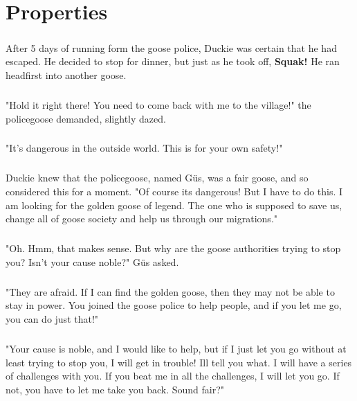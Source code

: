 \chapter{Properties}
\paragraph{} After 5 days of running form the goose police, Duckie was certain that he had escaped. He decided to stop for dinner, but just as he took off, \textbf{Squak!} He ran headfirst into another goose. 
\paragraph{} "Hold it right there! You need to come back with me to the village!" the policegoose demanded, slightly dazed. 
\paragraph{} "It's dangerous in the outside world. This is for your own safety!"
\paragraph{} Duckie knew that the policegoose, named Güs, was a fair goose, and so considered this for a moment. "Of course its dangerous! But I have to do this. I am looking for the golden goose of legend. The one who is supposed to save us, change all of goose society and help us through our migrations."
\paragraph{} "Oh. Hmm, that makes sense. But why are the goose authorities trying to stop you? Isn't your cause noble?" Güs asked.
\paragraph{} "They are afraid. If I can find the golden goose, then they may not be able to stay in power. You joined the goose police to help people, and if you let me go, you can do just that!"
\paragraph{} "Your cause is noble, and I would like to help, but if I just let you go without at least trying to stop you, I will get in trouble! Ill tell you what. I will have a series of challenges with you. If you beat me in all the challenges, I will let you go. If not, you have to let me take you back. Sound fair?"
